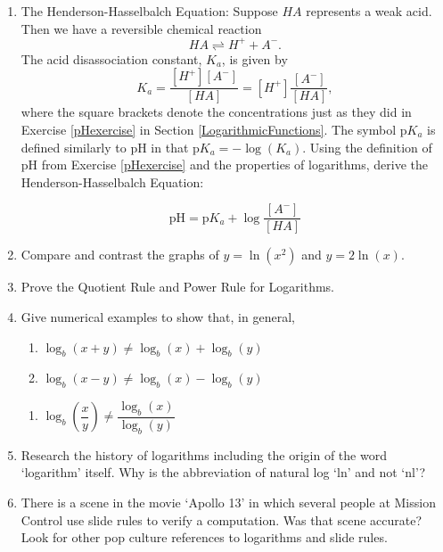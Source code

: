\begin{enumerate}
\begin{enumerate}
\end{enumerate}   

\item \label{HendersonHasselbalch}  The Henderson-Hasselbalch Equation:  Suppose $HA$ represents a weak acid. Then we have a reversible chemical reaction 
\[HA \rightleftharpoons H^{+} + A^{-}.\]  
The acid disassociation constant, $K_{a}$, is given by 
\[K_{a} = \frac{[H^{+}][A^{-}]}{[HA]} = [H^{+}]\frac{[A^{-}]}{[HA]},\]
where the square brackets denote the concentrations just as they did in Exercise \ref{pHexercise} in Section \ref{LogarithmicFunctions}.  The symbol p$K_{a}$ is defined similarly to pH in that p$K_{a} = -\log(K_{a})$.  Using the definition of pH from Exercise \ref{pHexercise} and the properties of logarithms, derive the Henderson-Hasselbalch Equation:

\[\mbox{pH} = \mbox{p}K_{a} + \log\dfrac{[A^{-}]}{[HA]}\]

\item Compare and contrast the graphs of $y = \ln(x^{2})$ and $y = 2\ln(x)$.

\item Prove the Quotient Rule and Power Rule for Logarithms.

\item Give numerical examples to show that, in general,

\begin{multicols}{2}
\begin{enumerate}

\item $\log_{b}(x + y) \neq \log_{b}(x) + \log_{b}(y)$
\item $\log_{b}(x - y) \neq \log_{b}(x) - \log_{b}(y)$
\setcounter{HWindent}{\value{enumii}}
\end{enumerate}
\end{multicols}

\begin{enumerate}
\setcounter{enumii}{\value{HWindent}}

\item $\log_{b}\left(\dfrac{x}{y}\right) \neq \dfrac{\log_{b}(x)}{\log_{b}(y)}$

\end{enumerate}

\item Research the history of logarithms including the origin of the word `logarithm' itself.  Why is the abbreviation of natural log `ln' and not `nl'?

\item There is a scene in the movie `Apollo 13' in which several people at Mission Control use slide rules to verify a computation.  Was that scene accurate?  Look for other pop culture references to logarithms and slide rules.


\setcounter{HW}{\value{enumi}}
\end{enumerate}

